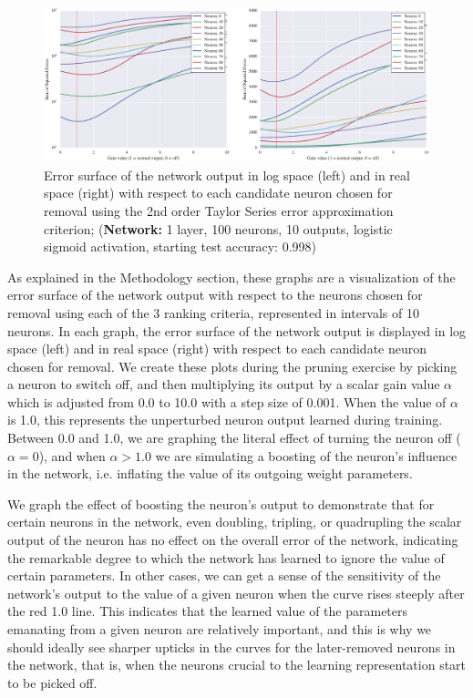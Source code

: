 \begin{figure}[!hb]
\centering
\includegraphics[width=\linewidth]{png/mnist-acc99-g2-gain.pdf}
\caption{Error surface of the network output in log space (left) and in real space (right) with respect to each candidate neuron chosen for removal using the 2nd order Taylor Series error approximation criterion; (\textbf{Network:} 1 layer, 100 neurons, 10 outputs, logistic sigmoid activation, starting test accuracy: 0.998)}
\label{fig:mnist-gt-single-layer}
\end{figure}

As explained in the Methodology section, these graphs are a visualization of the error surface of the network output with respect to the neurons chosen for removal using each of the 3 ranking criteria, represented in intervals of 10 neurons. In each graph, the error surface of the network output is displayed in log space (left) and in real space (right) with respect to each candidate neuron chosen for removal. We create these plots during the pruning exercise by picking a neuron to switch off, and then multiplying its output by a scalar gain value $\alpha$ which is adjusted from 0.0 to 10.0 with a step size of 0.001. When the value of $\alpha$ is 1.0, this represents the unperturbed neuron output learned during training. Between 0.0 and 1.0, we are graphing the literal effect of turning the neuron off ($\alpha = 0$), and when $\alpha > 1.0$ we are simulating a boosting of the neuron's influence in the network, i.e. inflating the value of its outgoing weight parameters. 

We graph the effect of boosting the neuron's output to demonstrate that for certain neurons in the network, even doubling, tripling, or quadrupling the scalar output of the neuron has no effect on the overall error of the network, indicating the remarkable degree to which the network has learned to ignore the value of certain parameters. In other cases, we can get a sense of the sensitivity of the network's output to the value of a given neuron when the curve rises steeply after the red 1.0 line. This indicates that the learned value of the parameters emanating from a given neuron are relatively important, and this is why we should ideally see sharper upticks in the curves for the later-removed neurons in the network, that is, when the neurons crucial to the learning representation start to be picked off. 

